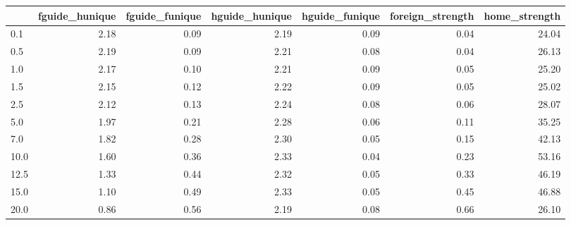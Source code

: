 \begin{tabular}{lrrrrrr}
\toprule
 & fguide_hunique & fguide_funique & hguide_hunique & hguide_funique & foreign_strength & home_strength \\
\midrule
0.1 & 2.18 & 0.09 & 2.19 & 0.09 & 0.04 & 24.04 \\
0.5 & 2.19 & 0.09 & 2.21 & 0.08 & 0.04 & 26.13 \\
1.0 & 2.17 & 0.10 & 2.21 & 0.09 & 0.05 & 25.20 \\
1.5 & 2.15 & 0.12 & 2.22 & 0.09 & 0.05 & 25.02 \\
2.5 & 2.12 & 0.13 & 2.24 & 0.08 & 0.06 & 28.07 \\
5.0 & 1.97 & 0.21 & 2.28 & 0.06 & 0.11 & 35.25 \\
7.0 & 1.82 & 0.28 & 2.30 & 0.05 & 0.15 & 42.13 \\
10.0 & 1.60 & 0.36 & 2.33 & 0.04 & 0.23 & 53.16 \\
12.5 & 1.33 & 0.44 & 2.32 & 0.05 & 0.33 & 46.19 \\
15.0 & 1.10 & 0.49 & 2.33 & 0.05 & 0.45 & 46.88 \\
20.0 & 0.86 & 0.56 & 2.19 & 0.08 & 0.66 & 26.10 \\
\bottomrule
\end{tabular}
